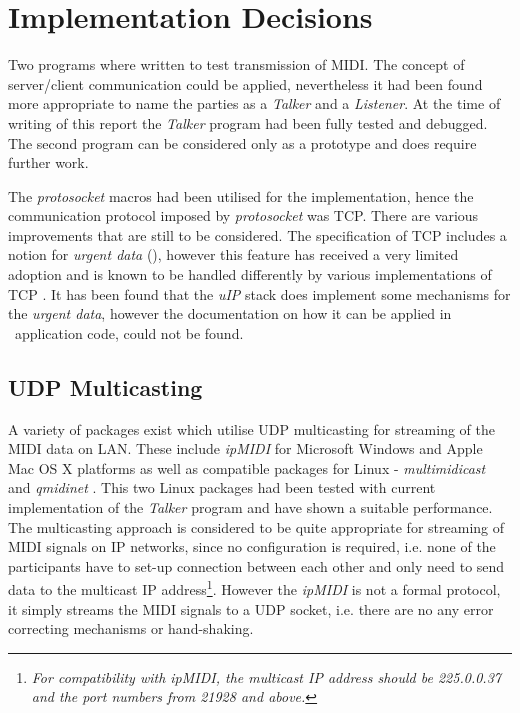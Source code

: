 \section{Implementation Decisions}

  Two programs where written to test transmission of MIDI. The concept of
 server/client communication could be applied, nevertheless it had been
 found more appropriate to name the parties as a \emph{Talker} and a
 \emph{Listener}. At the time of writing of this report the \emph{Talker}
 program had been fully tested and debugged. The second program can be
 considered only as a prototype and does require further work.

  The \emph{protosocket} macros had been utilised for the implementation,
 hence the communication protocol imposed by \emph{protosocket} was TCP.
 There are various improvements that are still to be considered.
 The specification of TCP includes a notion for \emph{urgent data}
 (), however this feature has received a very limited adoption
 and is known to be handled differently by various implementations of TCP
 \cite{ietf:draft:tcpm:urgdata}. It has been found that the \emph{uIP}
 stack does implement some mechanisms for the \emph{urgent data}, however
 the documentation on how it can be applied in \Contiki\ application code,
 could not be found. 


\subsection{UDP Multicasting}

  A variety of packages exist which utilise UDP multicasting for streaming
 of the MIDI data on LAN. These include \emph{ipMIDI} \cite{links:ipmidi} for
 Microsoft Windows and Apple Mac OS X platforms as well as compatible
 packages for Linux - \emph{multimidicast} \cite{links:multimidicast} and
 \emph{qmidinet} \cite{links:qmidinet}. This two Linux packages had been
 tested with current implementation of the \emph{Talker} program and have
 shown a suitable performance. The multicasting approach is considered to
 be quite appropriate for streaming of MIDI signals on IP networks, since
 no configuration is required, i.e. none of the participants have to set-up
 connection between each other and only need to send data to the multicast
 IP address\footnote{\emph{For compatibility with ipMIDI, the multicast IP
 address should be 225.0.0.37 and the port numbers from 21928 and above.}}.
 However the \emph{ipMIDI} is not a formal protocol, it simply streams the
 MIDI signals to a UDP socket, i.e. there are no any error correcting
 mechanisms or hand-shaking.


